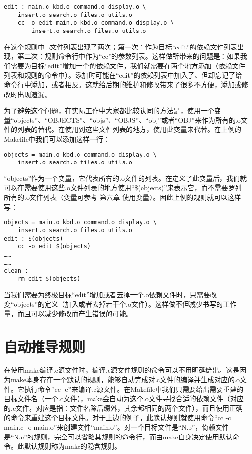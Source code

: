 \begin{Verbatim}[]
edit : main.o kbd.o command.o display.o \
    insert.o search.o files.o utils.o
    cc -o edit main.o kbd.o command.o display.o \
        insert.o search.o files.o utils.o
\end{Verbatim}

在这个规则中.o文件列表出现了两次；第一次：作为目标“edit”的依赖文件列表出现，第二次：规则命令行中作为“cc”的参数列表。这样做所带来的问题是：如果我们需要为目标“edit”增加一个的依赖文件，我们就需要在两个地方添加（依赖文件列表和规则的命令中）。添加时可能在“edit”的依赖列表中加入了、但却忘记了给命令行中添加，或者相反。这就给后期的维护和修改带来了很多不方便，添加或修改时出现遗漏。

为了避免这个问题，在实际工作中大家都比较认同的方法是，使用一个变量“objects”、“OBJECTS”、“objs”、“OBJS”、“obj”或者“OBJ”来作为所有的.o文件的列表的替代。在使用到这些文件列表的地方，使用此变量来代替。在上例的Makefile中我们可以添加这样一行：

\begin{Verbatim}[]
objects = main.o kbd.o command.o display.o \
    insert.o search.o files.o utils.o
\end{Verbatim}

“objects”作为一个变量，它代表所有的.o文件的列表。在定义了此变量后，我们就可以在需要使用这些.o文件列表的地方使用“\$(objects)”来表示它，而不需要罗列所有的.o文件列表（变量可参考 第六章 使用变量）。因此上例的规则就可以这样写：

\begin{Verbatim}[]
objects = main.o kbd.o command.o display.o \
    insert.o search.o files.o utils.o
edit : $(objects)
    cc -o edit $(objects)
……
……
clean :
    rm edit $(objects)
\end{Verbatim}


当我们需要为终极目标“edit”增加或者去掉一个.o依赖文件时，只需要改变“objects”的定义（加入或者去掉若干个.o文件）。这样做不但减少书写的工作量，而且可以减少修改而产生错误的可能。

\section{自动推导规则}
在使用make编译.c源文件时，编译.c源文件规则的命令可以不用明确给出。这是因为make本身存在一个默认的规则，能够自动完成对.c文件的编译并生成对应的.o文件。它执行命令“cc -c”来编译.c源文件。在Makefile中我们只需要给出需要重建的目标文件名（一个.o文件），make会自动为这个.o文件寻找合适的依赖文件（对应的.c文件。对应是指：文件名除后缀外，其余都相同的两个文件），而且使用正确的命令来重建这个目标文件。对于上边的例子，此默认规则就使用命令“cc -c main.c -o main.o”来创建文件“main.o”。对一个目标文件是“N.o”，倚赖文件是“N.c”的规则，完全可以省略其规则的命令行，而由make自身决定使用默认命令。此默认规则称为make的隐含规则。

